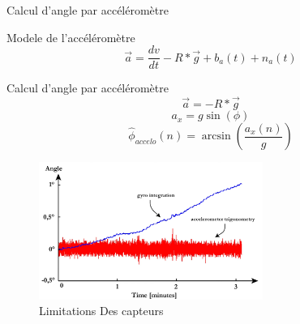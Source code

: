 \documentclass{beamer}
\begin{document}



\begin{frame}[fragile]{Calcul d'angle par accéléromètre}
	\begin{block}{Modele de l'accéléromètre}
		\begin{equation*}
			\vec{a} = \frac{dv}{dt} -R * \vec{g} + b_a(t) + n_a(t)
		\end{equation*}
	\end{block}
	\begin{block}{Calcul d'angle par accéléromètre}
		\begin{equation*}
			\vec{a} = -R * \vec{g} 
		\end{equation*}
		\begin{equation*}
			a_x = g \sin(\phi)
		\end{equation*}
		\begin{equation*}
			\hat{\phi}_{accelo}(n) = \arcsin\left(\frac{a_x(n)}{g}\right)
		\end{equation*}
	\end{block}
\end{frame}

\begin{frame}
	\begin{figure}
		\centering
		\includegraphics[width=0.65\textwidth]{assets/accel-gyro-limitations.png}
		\caption{Limitations Des capteurs}
	\end{figure}
\end{frame}
\end{document}
